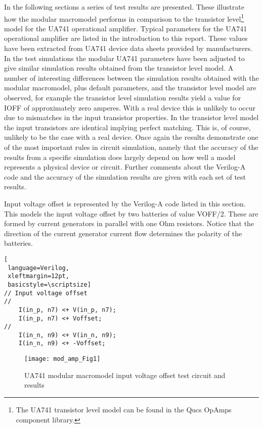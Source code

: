 In the following sections a series of test results are presented.
These illustrate how the modular macromodel performs in comparison to
the transistor level\footnote{The UA741 transistor level model can be
found in the Qucs OpAmps component library. } model for the UA741
operational amplifier.  Typical parameters for the UA741 operational
amplifier are listed in the introduction to this report.  These values
have been extracted from UA741 device data sheets provided by
manufacturers.  In the test simulations the modular UA741 parameters
have been adjusted to give similar simulation results obtained from
the transistor level model.  A number of interesting differences
between the simulation results obtained with the modular macromodel,
plus default parameters, and the transistor level model are observed,
for example the transistor level simulation results yield a value for
IOFF of approximately zero amperes.  With a real device this is
unlikely to occur due to mismatches in the input transistor
properties.  In the transistor level model the input transistors are
identical implying perfect matching.  This is, of course, unlikely to
be the case with a real device. Once again the results demonstrate one
of the most important rules in circuit simulation, namely that the
accuracy of the results from a specific simulation does largely depend
on how well a model represents a physical device or circuit.  Further
comments about the Verilog-A code and the accuracy of the simulation
results are given with each set of test results.



Input voltage offset is represented by the Verilog-A code listed in
this section.  This models the input voltage offset by two batteries
of value VOFF/2. These are formed by current generators in parallel
with one Ohm resistors.  Notice that the direction of the current
generator current flow determines the polarity of the batteries.


\begin{lstlisting}[
 language=Verilog, 
 xleftmargin=12pt,
 basicstyle=\scriptsize]
// Input voltage offset
//
    I(in_p, n7) <+ V(in_p, n7);
    I(in_p, n7) <+ Voffset;
//
    I(in_n, n9) <+ V(in_n, n9);
    I(in_n, n9) <+ -Voffset;
\end{lstlisting}

 
\begin{figure} [h]
  \centering
  \texttt{[image: mod\_amp\_Fig1]}
  \caption{UA741 modular macromodel input voltage offset test circuit and results}
  \label{fig:mod_amp1}
\end{figure} 

